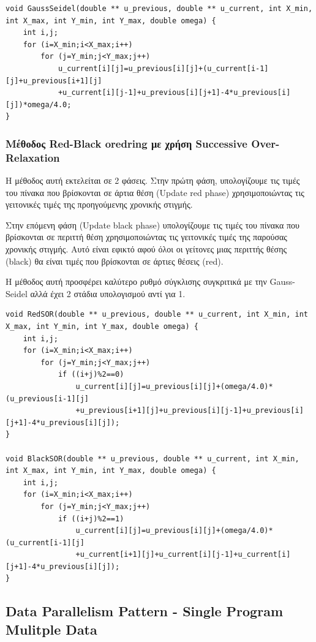 \documentclass[../final_report.tex]{subfiles}
\begin{document}
\begin{lstlisting}
void GaussSeidel(double ** u_previous, double ** u_current, int X_min, int X_max, int Y_min, int Y_max, double omega) {
	int i,j;
	for (i=X_min;i<X_max;i++)
		for (j=Y_min;j<Y_max;j++)
			u_current[i][j]=u_previous[i][j]+(u_current[i-1][j]+u_previous[i+1][j]
            +u_current[i][j-1]+u_previous[i][j+1]-4*u_previous[i][j])*omega/4.0;
}
\end{lstlisting}

\subsubsection{Μέθοδος Red-Black oredring με χρήση Successive Over-Relaxation}

Η μέθοδος αυτή εκτελείται σε 2 φάσεις. Στην πρώτη φάση, υπολογίζουμε τις τιμές του πίνακα που βρίσκονται σε άρτια θέση (Update red phase) χρησιμοποιώντας
τις γειτονικές τιμές της προηγούμενης χρονικής στιγμής. 

Στην επόμενη φάση (Update black phase) υπολογίζουμε τις τιμές του πίνακα που βρίσκονται σε περιττή θέση χρησιμοποιώντας τις γειτονικές τιμές της παρούσας 
χρονικής στιγμής. Αυτό είναι εφικτό αφού όλοι οι γείτονες μιας περιττής θέσης (black) θα είναι τιμές που βρίσκονται σε άρτιες θέσεις (red).

Η μέθοδος αυτή προσφέρει καλύτερο ρυθμό σύγκλισης συγκριτικά με την Gauss-Seidel αλλά έχει 2 στάδια υπολογισμού αντί για 1.

\begin{lstlisting}
void RedSOR(double ** u_previous, double ** u_current, int X_min, int X_max, int Y_min, int Y_max, double omega) {
	int i,j;
	for (i=X_min;i<X_max;i++)
		for (j=Y_min;j<Y_max;j++)
			if ((i+j)%2==0) 
				u_current[i][j]=u_previous[i][j]+(omega/4.0)*(u_previous[i-1][j]
                +u_previous[i+1][j]+u_previous[i][j-1]+u_previous[i][j+1]-4*u_previous[i][j]);		         
}

void BlackSOR(double ** u_previous, double ** u_current, int X_min, int X_max, int Y_min, int Y_max, double omega) {
	int i,j;
	for (i=X_min;i<X_max;i++)
		for (j=Y_min;j<Y_max;j++)
			if ((i+j)%2==1) 
				u_current[i][j]=u_previous[i][j]+(omega/4.0)*(u_current[i-1][j]
                +u_current[i+1][j]+u_current[i][j-1]+u_current[i][j+1]-4*u_previous[i][j]); 
}
\end{lstlisting}

\subsection{Data Parallelism Pattern - Single Program Mulitple Data}
\end{document}
